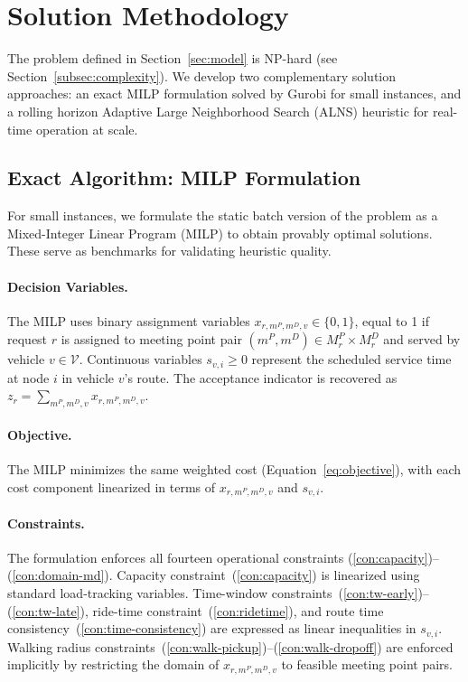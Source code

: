 
\section{Solution Methodology}\label{sec:algorithm}

The problem defined in Section~\ref{sec:model} is NP-hard (see
Section~\ref{subsec:complexity}). We develop two complementary solution approaches: an
exact MILP formulation solved by Gurobi for small instances, and a rolling horizon
Adaptive Large Neighborhood Search (ALNS) heuristic for real-time operation at scale.

\subsection{Exact Algorithm: MILP Formulation}\label{subsec:milp}

For small instances, we formulate the static batch version of the problem as a
Mixed-Integer Linear Program (MILP) to obtain provably optimal solutions. These serve as
benchmarks for validating heuristic quality.

\paragraph{Decision Variables.}
The MILP uses binary assignment variables $x_{r,m^P,m^D,v} \in \{0,1\}$, equal to 1 if
request $r$ is assigned to meeting point pair $(m^P, m^D) \in M_r^P \times M_r^D$ and
served by vehicle $v \in \mathcal{V}$. Continuous variables $s_{v,i} \geq 0$ represent
the scheduled service time at node $i$ in vehicle $v$'s route. The acceptance indicator
is recovered as $z_r = \sum_{m^P, m^D, v} x_{r,m^P,m^D,v}$.

\paragraph{Objective.}
The MILP minimizes the same weighted cost (Equation~\ref{eq:objective}), with each cost
component linearized in terms of $x_{r,m^P,m^D,v}$ and $s_{v,i}$.

\paragraph{Constraints.}
The formulation enforces all fourteen operational constraints
(\ref{con:capacity})--(\ref{con:domain-md}). Capacity constraint~(\ref{con:capacity}) is
linearized using standard load-tracking variables. Time-window
constraints~(\ref{con:tw-early})--(\ref{con:tw-late}), ride-time
constraint~(\ref{con:ridetime}), and route time consistency~(\ref{con:time-consistency})
are expressed as linear inequalities in $s_{v,i}$. Walking radius
constraints~(\ref{con:walk-pickup})--(\ref{con:walk-dropoff}) are enforced implicitly by
restricting the domain of $x_{r,m^P,m^D,v}$ to feasible meeting point pairs.

